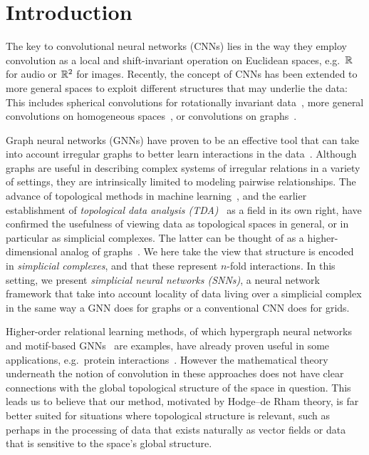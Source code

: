 \section{Introduction}

The key to convolutional neural networks (CNNs) lies in the way they employ convolution as a local and shift-invariant operation on Euclidean spaces, e.g.\ $\mathbb{R}$ for audio or $\mathbb{R}^2$ for images.
Recently, the concept of CNNs has been extended to more general spaces to exploit different structures that may underlie the data:
This includes spherical convolutions for rotationally invariant data~\cite{cohen2018sphericalcnn,esteves2018sphericalcnn,defferrard2020deepsphere}, more general convolutions on homogeneous spaces~\cite{cohen2016groupnn,kondor2018groupnn,worrall2017harmonicnn}, or convolutions on graphs~\cite{bruna2014graphnn,defferrard2016convolutional}.

Graph neural networks (GNNs) have proven to be an effective tool that can take into account irregular graphs to better learn interactions in the data~\cite{bronstein2017geometric,wu2020survey}.
Although graphs are useful in describing complex systems of irregular relations in a variety of settings, they are intrinsically limited to modeling pairwise relationships. The advance of topological methods in machine learning~\cite{Gabrielsson2020topological, Hofer2019LearningRO, rieck2018neural}, and the earlier establishment of \emph{topological data analysis (TDA)}~\cite{carlsson2008,chazal2017,edelsbrunner2010computational,ghrist2008barcodes} as a field in its own right, have confirmed the usefulness of viewing data as topological spaces in general, or in particular as simplicial complexes. The latter can be thought of as a higher-dimensional analog of graphs~\cite{moore2012,patania2017}. We here take the view that structure is encoded in \emph{simplicial complexes}, and that these represent $n$-fold interactions. In this setting, we present \emph{simplicial neural networks (SNNs)}, a neural network framework that take into account locality of data living over a simplicial complex in the same way a GNN does for graphs or a conventional CNN does for grids.

Higher-order relational learning methods, of which hypergraph neural networks~\cite{feng2018hypergraphs} and motif-based GNNs~\cite{monti2018motif} are examples, have already proven useful in some applications, e.g.\ protein interactions~\cite{ze2020graph}. However the mathematical theory underneath the notion of convolution in these approaches does not have clear connections with the global topological structure of the space in question. This leads us to believe that our method, motivated by Hodge--de Rham theory, is far better suited for situations where topological structure is relevant, such as perhaps in the processing of data that exists naturally as vector fields or data that is sensitive to the space's global structure.
